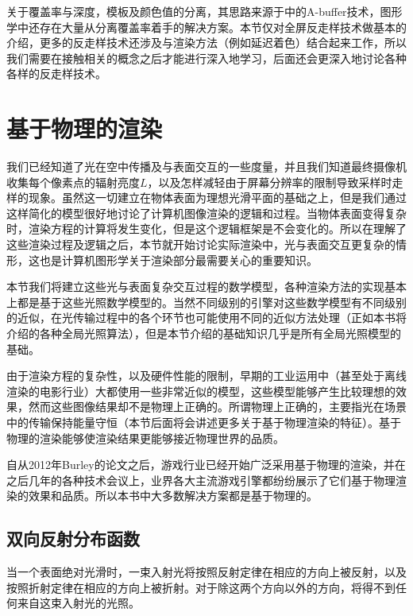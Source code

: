关于覆盖率与深度，模板及颜色值的分离，其思路来源于\cite{a:TheA-bufferanAntialiasedHiddenSurfaceMethod}中的A-buffer技术，图形学中还存在大量从分离覆盖率着手的解决方案。本节仅对全屏反走样技术做基本的介绍，更多的反走样技术还涉及与渲染方法（例如延迟着色）结合起来工作，所以我们需要在接触相关的概念之后才能进行深入地学习，后面还会更深入地讨论各种各样的反走样技术。




\section{基于物理的渲染}
我们已经知道了光在空中传播及与表面交互的一些度量，并且我们知道最终摄像机收集每个像素点的辐射亮度$L$，以及怎样减轻由于屏幕分辨率的限制导致采样时走样的现象。虽然这一切建立在物体表面为理想光滑平面的基础之上，但是我们通过这样简化的模型很好地讨论了计算机图像渲染的逻辑和过程。当物体表面变得复杂时，渲染方程的计算将发生变化，但是这个逻辑框架是不会变化的。所以在理解了这些渲染过程及逻辑之后，本节就开始讨论实际渲染中，光与表面交互更复杂的情形，这也是计算机图形学关于渲染部分最需要关心的重要知识。

本节我们将建立这些光与表面复杂交互过程的数学模型，各种渲染方法的实现基本上都是基于这些光照数学模型的。当然不同级别的引擎对这些数学模型有不同级别的近似，在光传输过程中的各个环节也可能使用不同的近似方法处理（正如本书将介绍的各种全局光照算法），但是本节介绍的基础知识几乎是所有全局光照模型的基础。

由于渲染方程的复杂性，以及硬件性能的限制，早期的工业运用中（甚至处于离线渲染的电影行业）大都使用一些非常近似的模型，这些模型能够产生比较理想的效果，然而这些图像结果却不是物理上正确的。所谓物理上正确的，主要指光在场景中的传输保持能量守恒（本节后面将会讲述更多关于基于物理渲染的特征）。基于物理的渲染能够使渲染结果更能够接近物理世界的品质。

自从2012年Burley的论文\cite{a:PhysicallyBasedShadingatDisney}之后，游戏行业已经开始广泛采用基于物理的渲染，并在之后几年的各种技术会议上，业界各大主流游戏引擎都纷纷展示了它们基于物理渲染的效果和品质。所以本书中大多数解决方案都是基于物理的。




\subsection{双向反射分布函数}\label{sec:intro-BRDF}
当一个表面绝对光滑时，一束入射光将按照反射定律在相应的方向上被反射，以及按照折射定律在相应的方向上被折射。对于除这两个方向以外的方向，将得不到任何来自这束入射光的光照。

